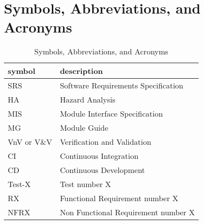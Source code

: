 \documentclass[12pt, titlepage]{article}
\begin{document}
\fi

\newpage

\tableofcontents

\listoftables


\newpage

\section{Symbols, Abbreviations, and Acronyms}

\renewcommand{\arraystretch}{1.2}
\begin{table}[hp]
\caption{Symbols, Abbreviations, and Acronyms}
\begin{tabular}{l l} 
  \toprule		
  \textbf{symbol} & \textbf{description}\\
  \midrule 
  SRS & Software Requirements Specification\\
  HA & Hazard Analysis\\
  MIS & Module Interface Specification\\
  MG & Module Guide\\
  VnV or V\&V & Verification and Validation\\
  CI & Continuous Integration\\
  CD & Continuous Development\\
  Test-X & Test number X\\
  RX & Functional Requirement number X\\
  NFRX & Non Functional Requirement number X\\
  \bottomrule
\end{tabular}\\
\end{table}



\newpage

\end{document}
